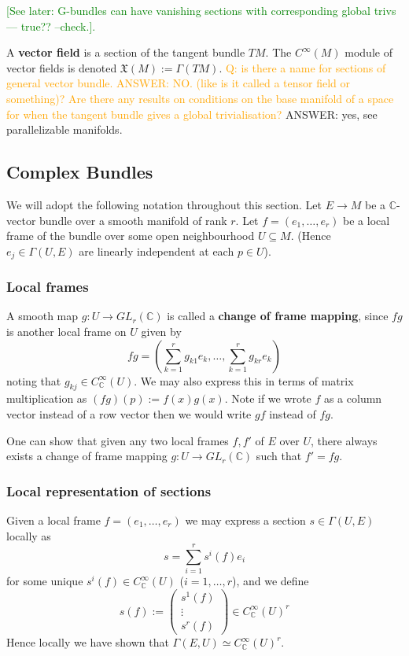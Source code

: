 \documentclass[a4paper]{article}
\theoremstyle{definition} \newtheorem*{definition}{Definition}
\theoremstyle{definition} \newtheorem*{definitions}{Definitions}
\theoremstyle{plain} \newtheorem{theorem}{Theorem}[section]
\theoremstyle{plain} \newtheorem{proposition}[theorem]{Proposition}
\theoremstyle{plain} \newtheorem{corollary}[theorem]{Corollary}
\theoremstyle{plain} \newtheorem{lemma}[theorem]{Lemma}
\theoremstyle{plain} \newtheorem{example}[theorem]{Example}
\newcommand{\question}[1]{\textcolor{orange}{#1}}
\newcommand{\finish}[1]{\textcolor{green}{#1}}
\newcommand{\defn}[1]{\textbf{#1}}
\newcommand{\complexnos}{\mathbb{C}}
\newcommand{\smoothCmaps}{C^\infty_\complexnos (U)}
\begin{document}
\finish{[See later: G-bundles can have vanishing sections with corresponding global trivs --- true?? --check.].}

A \defn{vector field} is a section of the tangent bundle $TM$. The $C^\infty (M)$ module of vector fields is denoted $\mathfrak{X}(M):=\Gamma(TM)$.
\question{Q: is there a name for sections of general vector bundle. ANSWER: NO. (like is it called a tensor field or something)?} \question{Are there any results on conditions on the base manifold of a space for when the tangent bundle gives a global trivialisation? } ANSWER: yes, see parallelizable manifolds.

\subsection{Complex Bundles}

We will adopt the following notation throughout this section. Let $E\to M$ be a $\complexnos$-vector bundle over a smooth manifold of rank $r$.
Let $f=(e_1,\ldots, e_r)$ be a local frame of the bundle over some open neighbourhood $U\subseteq M$. (Hence $e_j\in \Gamma(U, E)$ are linearly independent at each $p\in U$).

\subsubsection{Local frames}
A smooth map $g:U\to GL_r(\complexnos)$ is called a \defn{change of frame mapping}, since $fg$ is another local frame on $U$ given by 
$$fg=(\sum_{k=1}^r g_{k1}e_k,\ldots, \sum_{k=1}^r g_{kr}e_k)$$
noting that $g_{kj}\in \smoothCmaps$. We may also express this in terms of matrix multiplication as $(fg)(p):=f(x)g(x)$. Note if we wrote $f$ as a column vector instead of a row vector then we would write $gf$ instead of $fg$.

One can show that given any two local frames $f, f'$ of $E$ over $U$, there always exists a change of frame mapping $g:U\to GL_r(\complexnos)$ such that $f'=fg$. 

\subsubsection{Local representation of sections}
Given a local frame $f=(e_1,\ldots, e_r)$ we may express a section $s\in \Gamma(U, E)$ locally as
$$s=\sum_{i=1}^r s^i(f)e_i$$
for some unique $s^i(f)\in \smoothCmaps$ ($i=1,\ldots, r$), and we define 
$$s(f):= \begin{pmatrix}s^1(f) \\ \vdots \\ s^r(f)\end{pmatrix} \in \smoothCmaps^r$$
Hence locally we have shown that $\Gamma(E, U) \simeq \smoothCmaps^r$.
\end{document}
